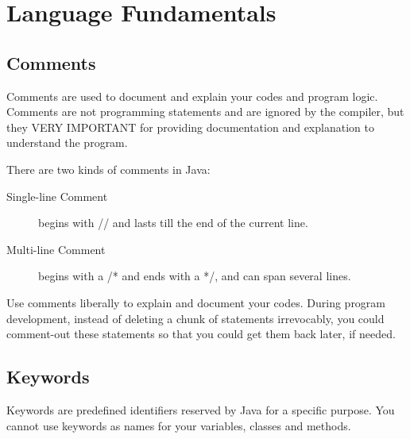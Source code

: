 \documentclass[11pt,a4paper]{article}
\begin{document}
\section*{Language Fundamentals}
\subsection*{Comments}
Comments are used to document and explain your codes and program logic. Comments are not programming statements and are ignored by the compiler, but they VERY IMPORTANT for providing documentation and explanation to understand the program.

There are two kinds of comments in Java:
\begin{description}
\item [Single-line Comment] begins with // and lasts till the end of the current line.
\item [Multi-line Comment] begins with a /* and ends with a */, and can span several lines.
\end{description}
Use comments liberally to explain and document your codes. During program development, instead of deleting a chunk of statements irrevocably, you could comment-out these statements so that you could get them back later, if needed.
\subsection*{Keywords}
Keywords are predefined identifiers reserved by Java for a specific purpose. You cannot use keywords as names for your variables, classes and methods.
\end{document}
